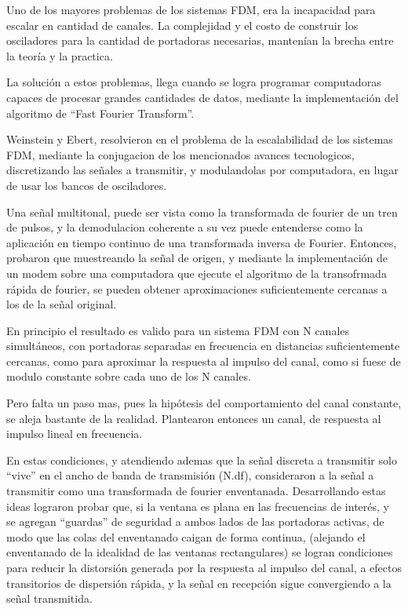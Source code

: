 Uno de los mayores problemas de los sistemas FDM, era la incapacidad para escalar en cantidad de canales. La complejidad y el costo de construir los osciladores para la cantidad de portadoras necesarias, mantenían la brecha entre la teoría y la practica. 

La solución a estos problemas, llega cuando se logra programar computadoras capaces de procesar grandes cantidades de datos, mediante la implementación del algoritmo de “Fast Fourier Transform”. 

Weinstein y Ebert, resolvieron en \cite{discrete-ofdm} el problema de la escalabilidad de los sistemas FDM, mediante la conjugacion de los mencionados avances tecnologicos, discretizando las señales a transmitir, y modulandolas por computadora, en lugar de usar los bancos de osciladores. 

Una señal multitonal, puede ser vista como la transformada de fourier de un tren de pulsos, y la demodulacion coherente a su vez puede entenderse como la aplicación en tiempo continuo de una transformada inversa de Fourier. Entonces, probaron que muestreando la señal de origen, y mediante la implementación de un modem sobre una computadora que ejecute el algoritmo de la transofrmada rápida de fourier, se pueden obtener aproximaciones suficientemente cercanas a los de la señal original. 

En principio el resultado es valido para un sistema FDM con N canales simultáneos, con portadoras separadas en frecuencia en distancias suficientemente cercanas, como para aproximar la respuesta al impulso del canal, como si fuese de modulo constante sobre cada uno de los N canales. 

Pero falta un paso mas, pues la hipótesis del comportamiento del canal constante, se aleja bastante de la realidad. Plantearon entonces un canal, de respuesta al impulso lineal en frecuencia.

En estas condiciones, y atendiendo ademas que la señal discreta a transmitir solo “vive” en el ancho de banda de transmisión (N.df), consideraron a la señal a transmitir como una transformada de fourier enventanada. Desarrollando estas ideas lograron probar que, si la ventana es plana en las frecuencias de interés, y se agregan “guardas” de seguridad a ambos lados de las portadoras activas, de modo que las colas del enventanado caigan de forma continua, (alejando el enventanado de la idealidad de las ventanas rectangulares) se logran condiciones para reducir la distorsión generada por la respuesta al impulso del canal, a efectos transitorios de dispersión rápida, y la señal en recepción sigue convergiendo a la señal transmitida.

